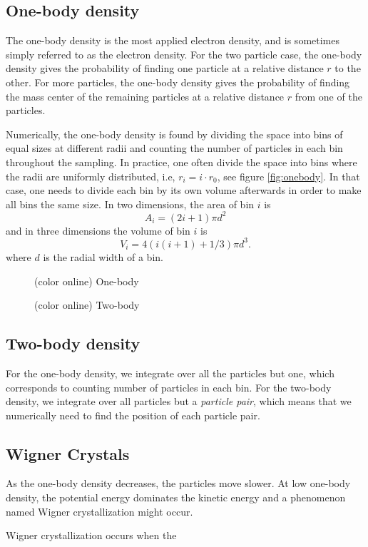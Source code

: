 \subsection{One-body density}
The one-body density is the most applied electron density, and is sometimes simply referred to as the electron density. For the two particle case, the one-body density gives the probability of finding one particle at a relative distance $r$ to the other. For more particles, the one-body density gives the probability of finding the mass center of the remaining particles at a relative distance $r$ from one of the particles.

Numerically, the one-body density is found by dividing the space into bins of equal sizes at different radii and counting the number of particles in each bin throughout the sampling. In practice, one often divide the space into bins where the radii are uniformly distributed, i.e, $r_i=i\cdot r_0$, see figure \eqref{fig:onebody}. In that case, one needs to divide each bin by its own volume afterwards in order to make all bins the same size. In two dimensions, the area of bin $i$ is
\begin{equation}
A_i=(2i+1)\pi d^2
\end{equation}
and in three dimensions the volume of bin $i$ is
\begin{equation}
V_i=4(i(i+1)+1/3)\pi d^3.
\end{equation}
where $d$ is the radial width of a bin. 

\begin{figure}
	\centering
	\label{fig:onebody}
	
	\caption{(color online) One-body}
\end{figure}

\begin{figure}
	\centering
	\label{fig:twobody}
	
	\caption{(color online) Two-body}
\end{figure}

\subsection{Two-body density}
For the one-body density, we integrate over all the particles but one, which corresponds to counting number of particles in each bin. For the two-body density, we integrate over all particles but a \textit{particle pair}, which means that we numerically need to find the position of each particle pair. 

\subsection{Wigner Crystals}
As the one-body density decreases, the particles move slower. At low one-body density, the potential energy dominates the kinetic energy and a phenomenon named Wigner crystallization might occur.  

Wigner crystallization occurs when the 



